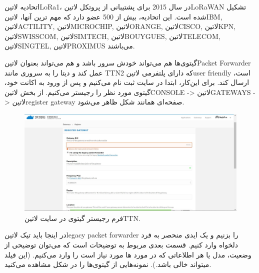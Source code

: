 اتحادیه ‌لاتین{LoRa}1، در سال 2015 برای پشتیبانی از پروتکل ‌لاتین{LoRaWAN} تشکیل شده است. این اتحادیه، بیش از 500 عضو دارد که مهم ترین آنها، ‌لاتین{IBM}, ‌لاتین{ACTILITY}, ‌لاتین{MICROCHIP}, ‌لاتین{ORANGE}, ‌لاتین{CISCO}, ‌لاتین{KPN}, ‌لاتین{SWISSCOM}, ‌لاتین{SIMTECH}, ‌لاتین{BOUYGUES}, ‌لاتین{TELECOM}, ‌لاتین{SINGTEL}, ‌لاتین{PROXIMUS} می‌باشند.

گیتوی‌ها هم می‌تواند خودش سرور باشد و هم می‌تواند بعنوان ‌لاتین{Packet Forwarder} عمل کند و دیتا را به سروری مانند TTN2 که دارای پلتفرمی ‌لاتین{user friendly} است، ارسال کند. برای این‌کار، ابتدا در سایت ثبت نام می‌کنیم و پس از ورود به اکانت خود، گیتوی مورد نظر را رجیستر می‌کنیم. از بخش  ‌لاتین{CONSOLE} -> ‌لاتین{GATEWAYS} -> ‌لاتین{register gateway} صفحه‌ای همانند شکل  ظاهر می‌شود.

\begin{figure}[!h]
	\centering
	\includegraphics[width=\linewidth]{Assets/TTNregister.png}
	\caption{فرم رجیستر گیتوی در سایت ‌لاتین{TTN}.}
	\label{fig:TTNregister}
\end{figure}
 
در اینجا باید تیک ‌لاتین{legacy packet forwarder} را بزنیم و یک ایدی منحصر به فرد دلخواه وارد کنیم. قسمت بعدی مربوط به توضیحات است که می‌توان توضیحی از وضعیت، مدل یا هر اطلاعاتی که در مورد ها مورد نیاز است را وارد می‌کنیم. (این فیلد میتواند خالی باشد.). نمونه‌هایی از گیتوی‌ها را در شکل  مشاهده می‌کنید.

